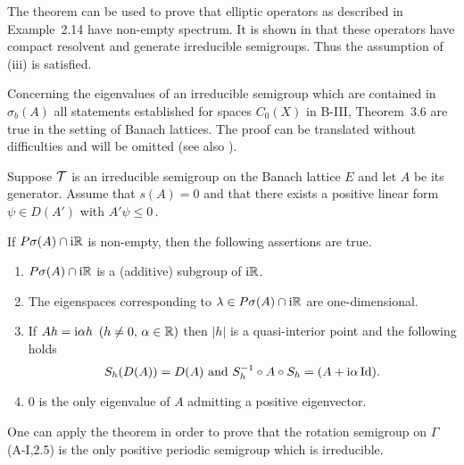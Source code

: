 The theorem can be used to prove that elliptic operators as described in Example~2.14 have non-empty spectrum.
It is shown in \citet{amann:1983} that these operators have compact resolvent and generate irreducible semigroups.
Thus the assumption of (iii) is satisfied.

Concerning the eigenvalues of an irreducible semigroup which are contained in $\sigma_{b}(A)$ all statements established for spaces $C_{0}(X)$ in B-III, Theorem~3.6 are true in the setting of Banach lattices.
The proof can be translated without difficulties and will be omitted (see also \citet[Theorem~2.6]{greiner:1982}).

\begin{theorem}\label{thm:c3-3.8}
	
	Suppose $\mathcal{T}$ is an irreducible semigroup on the Banach lattice $E$ and let $A$ be its generator.
	Assume that $s(A) = 0$ and that there exists a positive linear form $\psi \in D(A')$ with $A'\psi \leq 0$\,.

    If $P\sigma(A)\cap \mathrm{i}\mathbb{R} $ is non-empty, then the following assertions are true.
	\begin{enumerate}[\upshape (i]
		\item 
			$P\sigma(A)\cap \mathrm{i}\mathbb{R} $ is a (additive) subgroup of $\mathrm{i}\mathbb{R} $.
	
		\item 
		The eigenspaces corresponding to $\lambda \in P\sigma(A)\cap \mathrm{i}\mathbb{R} $ are one-dimensional.
	
		\item 
		If $Ah = \mathrm{i}\alpha h$ $(h \neq 0,\, \alpha \in \mathbb{R} )$ then $|h|$ is a quasi-interior point and the following holds
		\begin{equation}\label{eq:c3-3.13}
			S_{h}(D(A)) = D(A) \text{ and } S_{h}^{-1}\circ A\circ S_{h} = (A + \mathrm{i}\alpha\operatorname{Id}).
		\end{equation}
		
		\item 
		$0$ is the only eigenvalue of $A$ admitting a positive eigenvector.
	\end{enumerate}
\end{theorem}
One can apply the theorem in order to prove that the rotation semigroup on $\Gamma$ (\cf A-I,2.5) is the only positive periodic semigroup which is irreducible.

